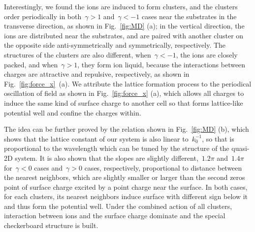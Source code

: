 \documentclass[aps,prl,reprint,showpacs,floatfix,superscriptaddress]{revtex4-2}
\newcommand{\V}[1]{\boldsymbol{#1}} %
\newcommand{\abs}[1]{\left|#1\right|} %
\begin{document}
Interestingly, we found the ions are induced to form clusters, and the clusters order periodically in both~$\gamma > 1$ and~$\gamma < -1$ cases near the substrates in the transverse direction, as shown in Fig.~\ref{fig:MD} (a); in the vertical direction, the ions are distributed near the substrates, and are paired with another cluster on the opposite side anti-symmetrically and symmetrically, respectively.
The structures of the clusters are also different, when~$\gamma < -1$, the ions are closely packed, and when~$\gamma > 1$, they form ion liquid, because the interactions between charges are attractive and repulsive, respectively, as shown in Fig.~\ref{fig:force_x}~(a).
We attribute the lattice formation process to the periodical oscillation of field as shown in Fig.~\ref{fig:force_x} (a), which allows all charges to induce the same kind of surface charge to another cell so that forms lattice-like potential well and confine the charges within.

The idea can be further proved by the relation shown in Fig.~\ref{fig:MD} (b), which shows that the lattice constant of our system is also linear to~$k_0^{-1}$, so that is proportional to the wavelength which can be tuned by the structure of the quasi-2D system.
It is also shown that the slopes are slightly different,~$1.2 \pi$ and~$1.4 \pi$ for~$\gamma < 0$ cases and~$\gamma > 0$ cases, respectively, proportional to distance between the nearest neighbors, which are slightly smaller or larger than the second zeros point of surface charge excited by a point charge near the surface.
In both cases, for each clusters, its nearest neighbors induce surface with different sign below it and thus form the potential well.
Under the combined action of all clusters, interaction between ions and the surface charge dominate and the special checkerboard structure is built.


\end{document}
